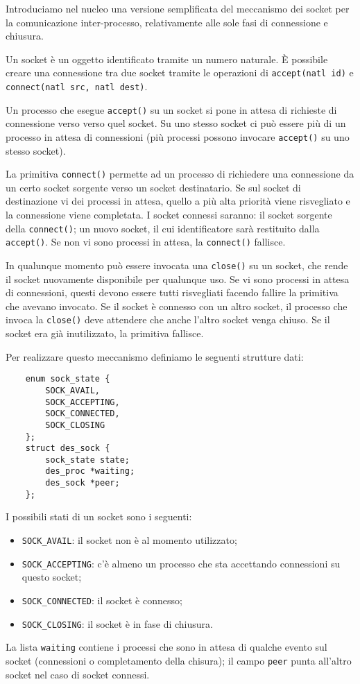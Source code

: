 Introduciamo nel nucleo una versione semplificata del meccanismo dei socket per
la comunicazione inter-processo, relativamente alle sole fasi di connessione e chiusura.

Un socket \`e un oggetto identificato tramite un numero naturale. \`E possibile
creare una connessione tra due socket tramite le operazioni di
\verb|accept(natl id)| e \verb|connect(natl src, natl dest)|.

Un processo che esegue \verb|accept()| su un socket
si pone in attesa di richieste di connessione verso verso quel socket.
Su uno stesso socket ci pu\`o essere pi\`u di un processo in attesa di connessioni
(pi\`u processi possono invocare \verb|accept()| su uno stesso socket).

La primitiva \verb|connect()| permette ad un processo di richiedere una connessione
da un certo socket sorgente verso un socket destinatario. Se sul socket di destinazione
vi dei processi in attesa, quello a pi\`u alta priorit\`a viene risvegliato e la connessione
viene completata. I socket connessi saranno: il socket sorgente della \verb|connect()|;
un nuovo socket, il cui identificatore sar\`a restituito dalla \verb|accept()|.
Se non vi sono processi in attesa, la \verb|connect()| fallisce.

In qualunque momento pu\`o essere invocata una \verb|close()| su un socket, che rende
il socket nuovamente disponibile per qualunque uso.
Se vi sono processi in attesa di connessioni, questi devono essere tutti 
risvegliati facendo fallire la primitiva che avevano invocato. Se il socket
\`e connesso con un altro socket, il processo che invoca la \verb|close()| deve attendere che
anche l'altro socket venga chiuso. Se il socket era gi\`a inutilizzato, la primitiva fallisce.

Per realizzare questo meccanismo definiamo le seguenti strutture dati:

\begin{verbatim}
    enum sock_state {
        SOCK_AVAIL,
        SOCK_ACCEPTING,
        SOCK_CONNECTED,
        SOCK_CLOSING
    };
    struct des_sock {
        sock_state state;
        des_proc *waiting;
        des_sock *peer;
    };
\end{verbatim}

I possibili stati di un socket sono i seguenti:
\begin{itemize}
  \item \verb|SOCK_AVAIL|: il socket non \`e al momento utilizzato;
  \item \verb|SOCK_ACCEPTING|: c'\`e almeno un processo che sta accettando connessioni
    su questo socket;
  \item \verb|SOCK_CONNECTED|: il socket \`e connesso;
  \item \verb|SOCK_CLOSING|: il socket \`e in fase di chiusura.
\end{itemize}
La lista \verb|waiting| contiene i processi che sono in attesa di qualche evento sul socket
(connessioni o completamento della chisura); il campo \verb|peer| punta all'altro socket
nel caso di socket connessi.

